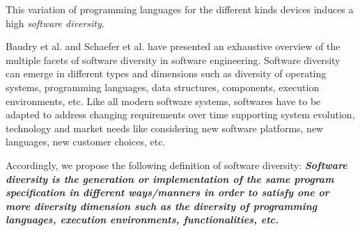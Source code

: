 This variation of programming languages for the different kinds devices induces a high \textit{software diversity}. 

Baudry et al.\cite{baudry2015multiple} and Schaefer et al.\cite{schaefer2012software} have presented an exhaustive overview of the multiple facets of software diversity in software engineering. 
Software diversity can emerge in different types and dimensions such as diversity of operating systems, programming languages, data structures, components, execution environments, etc. 
Like all modern software systems, softwares have to be adapted to address changing requirements over time supporting system evolution, technology and market needs like considering new software platforms, new languages, new customer choices, etc.







Accordingly, we propose the following definition of software diversity: 
\textit{\textbf{Software diversity is the generation or implementation of the same program specification in different ways/manners in order to satisfy one or more diversity dimension such as the diversity of programming languages, execution environments, functionalities, etc. }}
		



